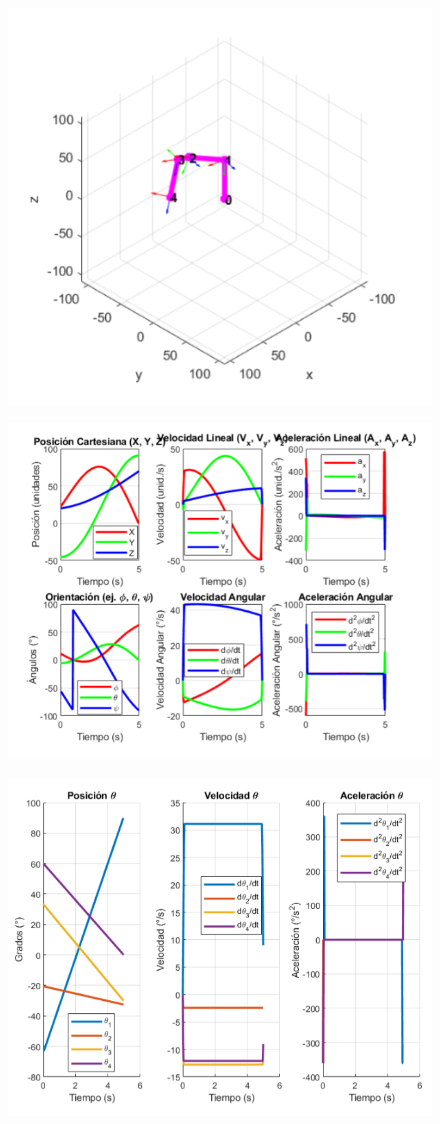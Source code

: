 \begin{figure}[H]
	\centering
	\includegraphics[width=0.7\linewidth]{img/inversa1}
	\caption{}
	\label{fig:inversa1}
\end{figure}

\begin{figure} [H]
	\centering
	\includegraphics[width=0.7\linewidth]{img/inversa2}
	\caption{}
	\label{fig:inversa2}
\end{figure}

\begin{figure} [H]
	\centering
	\includegraphics[width=0.7\linewidth]{img/inversa3}
	\caption{}
	\label{fig:inversa3}
\end{figure}

















